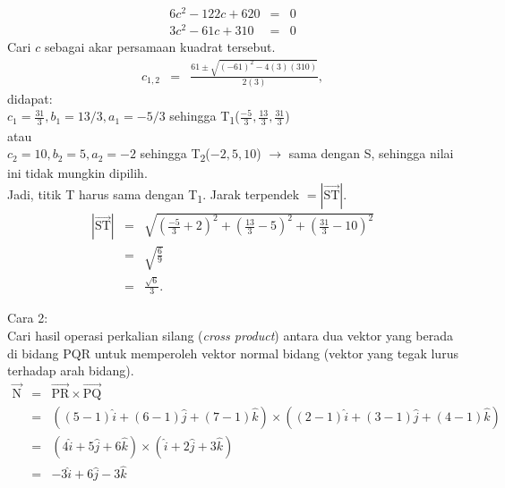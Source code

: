 \documentclass[11pt,fleqn]{exam}
\begin{document}
\begin{questions}
\begin{eqnarray*}
6c^2-122c+620&=&0\\
3c^2-61c+310&=&0
\end{eqnarray*}
Cari $c$ sebagai akar persamaan kuadrat tersebut.
\begin{eqnarray*}
c_{1,2}&=&\frac{61\pm\sqrt{(-61)^2-4(3)(310)}}{2(3)},
\end{eqnarray*}
didapat:\\
$c_1=\frac{31}{3}, b_1=13/3, a_1=-5/3$ sehingga T\textsubscript{1}($\frac{-5}{3},\frac{13}{3},\frac{31}{3}$)\\
atau\\
$c_2=10, b_2=5, a_2=-2$ sehingga T\textsubscript{2}($-2, 5, 10$) $\rightarrow$ sama dengan S, sehingga nilai ini tidak mungkin dipilih.\\
Jadi, titik T harus sama dengan T\textsubscript{1}. Jarak terpendek $=|\overrightarrow{\text{ST}}|$.
\begin{eqnarray*}
|\overrightarrow{\text{ST}}|&=&\sqrt{(\frac{-5}{3}+2)^2+(\frac{13}{3}-5)^2+(\frac{31}{3}-10)^2}\\
&=&\sqrt{\frac{6}{9}}\\
&=&\frac{\sqrt{6}}{3}.
\end{eqnarray*}

Cara 2:\\
Cari hasil operasi perkalian silang (\textit{cross product}) antara dua vektor yang berada di bidang PQR untuk memperoleh vektor normal bidang (vektor yang tegak lurus terhadap arah bidang). 
\begin{eqnarray*}
\overrightarrow{\text{N}}&=&\overrightarrow{\text{PR}}\times\overrightarrow{\text{PQ}}\\
&=&((5-1)\hat{i}+(6-1)\hat{j}+(7-1)\hat{k})\times((2-1)\hat{i}+(3-1)\hat{j}+(4-1)\hat{k})\\
&=&(4\hat{i}+5\hat{j}+6\hat{k})\times(\hat{i}+2\hat{j}+3\hat{k})\\
&=&-3\hat{i}+6\hat{j}-3\hat{k}
\end{eqnarray*}


\end{questions}
\end{document}
